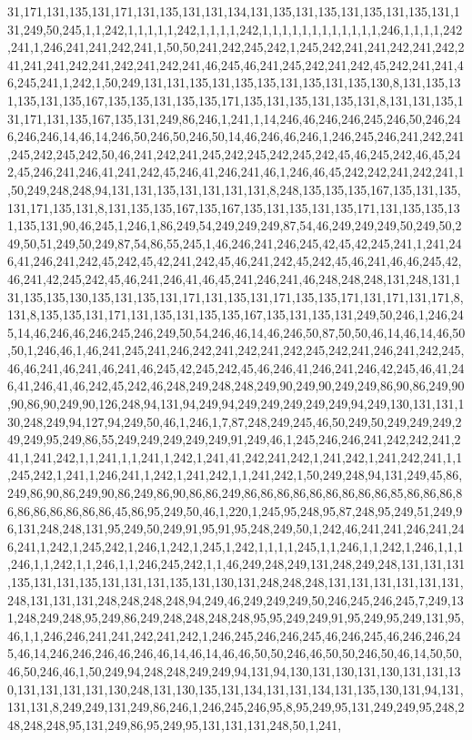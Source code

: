 31,171,131,135,131,171,131,135,131,131,134,131,135,131,135,131,135,131,135,131,131,249,50,245,1,1,242,1,1,1,1,1,242,1,1,1,1,242,1,1,1,1,1,1,1,1,1,1,1,1,246,1,1,1,1,242,241,1,246,241,241,242,241,1,50,50,241,242,245,242,1,245,242,241,241,242,241,242,241,241,241,242,241,242,241,242,241,46,245,46,241,245,242,241,242,45,242,241,241,46,245,241,1,242,1,50,249,131,131,135,131,135,135,131,135,131,135,130,8,131,135,131,135,131,135,167,135,135,131,135,135,171,135,131,135,131,135,131,8,131,131,135,131,171,131,135,167,135,131,249,86,246,1,241,1,14,246,46,246,246,245,246,50,246,246,246,246,14,46,14,246,50,246,50,246,50,14,46,246,46,246,1,246,245,246,241,242,241,245,242,245,242,50,46,241,242,241,245,242,245,242,245,242,45,46,245,242,46,45,242,45,246,241,246,41,241,242,45,246,41,246,241,46,1,246,46,45,242,242,241,242,241,1,50,249,248,248,94,131,131,135,131,131,131,131,8,248,135,135,135,167,135,131,135,131,171,135,131,8,131,135,135,167,135,167,135,131,135,131,135,171,131,135,135,131,135,131,90,46,245,1,246,1,86,249,54,249,249,249,87,54,46,249,249,249,50,249,50,249,50,51,249,50,249,87,54,86,55,245,1,46,246,241,246,245,42,45,42,245,241,1,241,246,41,246,241,242,45,242,45,42,241,242,45,46,241,242,45,242,45,46,241,46,46,245,42,46,241,42,245,242,45,46,241,246,41,46,45,241,246,241,46,248,248,248,131,248,131,131,135,135,130,135,131,135,131,171,131,135,131,171,135,135,171,131,171,131,171,8,131,8,135,135,131,171,131,135,131,135,135,167,135,131,135,131,249,50,246,1,246,245,14,46,246,46,246,245,246,249,50,54,246,46,14,46,246,50,87,50,50,46,14,46,14,46,50,50,1,246,46,1,46,241,245,241,246,242,241,242,241,242,245,242,241,246,241,242,245,46,46,241,46,241,46,241,46,245,42,245,242,45,46,246,41,246,241,246,42,245,46,41,246,41,246,41,46,242,45,242,46,248,249,248,248,249,90,249,90,249,249,86,90,86,249,90,90,86,90,249,90,126,248,94,131,94,249,94,249,249,249,249,249,94,249,130,131,131,130,248,249,94,127,94,249,50,46,1,246,1,7,87,248,249,245,46,50,249,50,249,249,249,249,249,95,249,86,55,249,249,249,249,249,91,249,46,1,245,246,246,241,242,242,241,241,1,241,242,1,1,241,1,1,241,1,242,1,241,41,242,241,242,1,241,242,1,241,242,241,1,1,245,242,1,241,1,246,241,1,242,1,241,242,1,1,241,242,1,50,249,248,94,131,249,45,86,249,86,90,86,249,90,86,249,86,90,86,86,249,86,86,86,86,86,86,86,86,86,85,86,86,86,86,86,86,86,86,86,86,45,86,95,249,50,46,1,220,1,245,95,248,95,87,248,95,249,51,249,96,131,248,248,131,95,249,50,249,91,95,91,95,248,249,50,1,242,46,241,241,246,241,246,241,1,242,1,245,242,1,246,1,242,1,245,1,242,1,1,1,1,245,1,1,246,1,1,242,1,246,1,1,1,246,1,1,242,1,1,246,1,1,246,245,242,1,1,46,249,248,249,131,248,249,248,131,131,131,135,131,131,135,131,131,131,135,131,130,131,248,248,248,131,131,131,131,131,131,248,131,131,131,248,248,248,248,94,249,46,249,249,249,50,246,245,246,245,7,249,131,248,249,248,95,249,86,249,248,248,248,248,95,95,249,249,91,95,249,95,249,131,95,46,1,1,246,246,241,241,242,241,242,1,246,245,246,246,245,46,246,245,46,246,246,245,46,14,246,246,246,46,246,46,14,46,14,46,46,50,50,246,46,50,50,246,50,46,14,50,50,46,50,246,46,1,50,249,94,248,248,249,249,94,131,94,130,131,130,131,130,131,131,130,131,131,131,131,130,248,131,130,135,131,134,131,131,134,131,135,130,131,94,131,131,131,8,249,249,131,249,86,246,1,246,245,246,95,8,95,249,95,131,249,249,95,248,248,248,248,95,131,249,86,95,249,95,131,131,131,248,50,1,241,